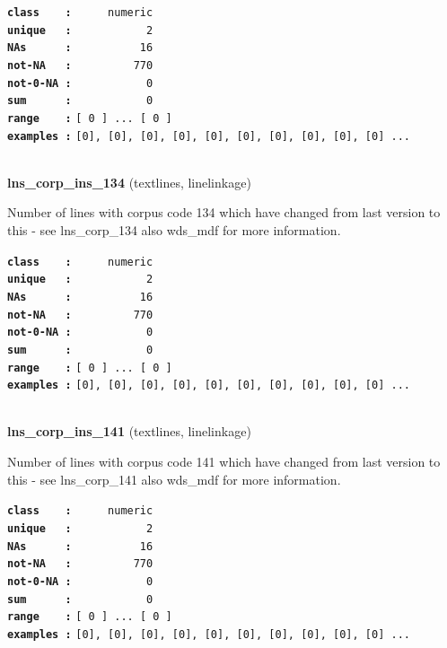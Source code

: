 \documentclass[]{article}
\begin{document}
\textbf{\texttt{class\ \ \ \ :}} \texttt{~~~~~numeric}\\
\textbf{\texttt{unique\ \ \ :}} \texttt{~~~~~~~~~~~2}\\
\textbf{\texttt{NAs\ \ \ \ \ \ :}} \texttt{~~~~~~~~~~16}\\
\textbf{\texttt{not-NA\ \ \ :}} \texttt{~~~~~~~~~770}\\
\textbf{\texttt{not-0-NA\ :}} \texttt{~~~~~~~~~~~0}\\
\textbf{\texttt{sum\ \ \ \ \ \ :}} \texttt{~~~~~~~~~~~0}\\
\textbf{\texttt{range\ \ \ \ :}}
\texttt{{[}\ 0\ {]}\ ...\ {[}\ 0\ {]}}\\
\textbf{\texttt{examples\ :}}
\texttt{{[}0{]},\ {[}0{]},\ {[}0{]},\ {[}0{]},\ {[}0{]},\ {[}0{]},\ {[}0{]},\ {[}0{]},\ {[}0{]},\ {[}0{]}\ ...}\\

~

\textbf{lns\_corp\_ins\_134} (textlines, linelinkage)

Number of lines with corpus code 134 which have changed from last
version to this - see lns\_corp\_134 also wds\_mdf for more information.

\textbf{\texttt{class\ \ \ \ :}} \texttt{~~~~~numeric}\\
\textbf{\texttt{unique\ \ \ :}} \texttt{~~~~~~~~~~~2}\\
\textbf{\texttt{NAs\ \ \ \ \ \ :}} \texttt{~~~~~~~~~~16}\\
\textbf{\texttt{not-NA\ \ \ :}} \texttt{~~~~~~~~~770}\\
\textbf{\texttt{not-0-NA\ :}} \texttt{~~~~~~~~~~~0}\\
\textbf{\texttt{sum\ \ \ \ \ \ :}} \texttt{~~~~~~~~~~~0}\\
\textbf{\texttt{range\ \ \ \ :}}
\texttt{{[}\ 0\ {]}\ ...\ {[}\ 0\ {]}}\\
\textbf{\texttt{examples\ :}}
\texttt{{[}0{]},\ {[}0{]},\ {[}0{]},\ {[}0{]},\ {[}0{]},\ {[}0{]},\ {[}0{]},\ {[}0{]},\ {[}0{]},\ {[}0{]}\ ...}\\

~

\textbf{lns\_corp\_ins\_141} (textlines, linelinkage)

Number of lines with corpus code 141 which have changed from last
version to this - see lns\_corp\_141 also wds\_mdf for more information.

\textbf{\texttt{class\ \ \ \ :}} \texttt{~~~~~numeric}\\
\textbf{\texttt{unique\ \ \ :}} \texttt{~~~~~~~~~~~2}\\
\textbf{\texttt{NAs\ \ \ \ \ \ :}} \texttt{~~~~~~~~~~16}\\
\textbf{\texttt{not-NA\ \ \ :}} \texttt{~~~~~~~~~770}\\
\textbf{\texttt{not-0-NA\ :}} \texttt{~~~~~~~~~~~0}\\
\textbf{\texttt{sum\ \ \ \ \ \ :}} \texttt{~~~~~~~~~~~0}\\
\textbf{\texttt{range\ \ \ \ :}}
\texttt{{[}\ 0\ {]}\ ...\ {[}\ 0\ {]}}\\
\textbf{\texttt{examples\ :}}
\texttt{{[}0{]},\ {[}0{]},\ {[}0{]},\ {[}0{]},\ {[}0{]},\ {[}0{]},\ {[}0{]},\ {[}0{]},\ {[}0{]},\ {[}0{]}\ ...}\\
\end{document}
